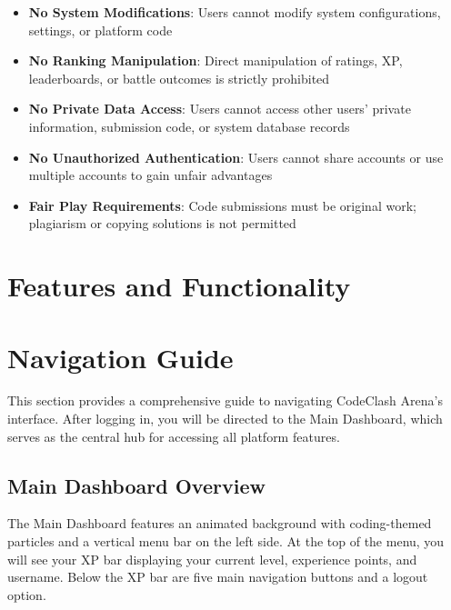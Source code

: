 \documentclass[12pt,a4paper]{article}
\begin{document}
\begin{itemize}[leftmargin=*]
\item \textbf{No System Modifications}: Users cannot modify system configurations, settings, or platform code
\item \textbf{No Ranking Manipulation}: Direct manipulation of ratings, XP, leaderboards, or battle outcomes is strictly prohibited
\item \textbf{No Private Data Access}: Users cannot access other users' private information, submission code, or system database records
\item \textbf{No Unauthorized Authentication}: Users cannot share accounts or use multiple accounts to gain unfair advantages
\item \textbf{Fair Play Requirements}: Code submissions must be original work; plagiarism or copying solutions is not permitted
\end{itemize}

\FloatBarrier


\section{Features and Functionality}

\FloatBarrier


\section{Navigation Guide}

This section provides a comprehensive guide to navigating CodeClash Arena's interface. After logging in, you will be directed to the Main Dashboard, which serves as the central hub for accessing all platform features.

\subsection{Main Dashboard Overview}

The Main Dashboard features an animated background with coding-themed particles and a vertical menu bar on the left side. At the top of the menu, you will see your XP bar displaying your current level, experience points, and username. Below the XP bar are five main navigation buttons and a logout option.
\end{document}
